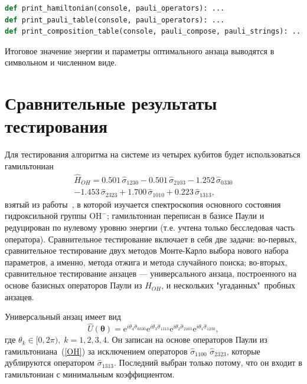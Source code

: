 \documentclass[a4paper]{report}
\begin{document}
\begin{lstlisting}[language=Python]
def print_hamiltonian(console, pauli_operators): ...
def print_pauli_table(console, pauli_operators): ...
def print_composition_table(console, pauli_compose, pauli_strings): ...
\end{lstlisting}

Итоговое значение энергии и параметры оптимального анзаца выводятся в символьном и численном виде.


\section{Сравнительные результаты тестирования}

Для тестирования алгоритма на системе из четырех кубитов будет использоваться гамильтониан
\begin{multline}\label{OH}
\hat{H}_{\scriptscriptstyle OH} = 0.501\,\hat{\sigma}_{1230} - 0.501\,\hat{\sigma}_{2103} - 1.252\,\hat{\sigma}_{0330} \\
- 1.453\,\hat{\sigma}_{2323} + 1.700\,\hat{\sigma}_{1010} + 0.223\,\hat{\sigma}_{1313},\quad
\end{multline}
взятый из работы~\cite{Cawley2013}, в которой изучается спектроскопия основного состояния гидроксильной группы $\mathrm{OH}^-$; гамильтониан переписан в базисе Паули и редуцирован по нулевому уровню энергии (т.е. учтена только бесследовая часть оператора). Сравнительное тестирование включает в себя две задачи: во-первых, сравнительное тестирование двух методов Монте-Карло выбора нового набора параметров, а именно, метода отжига и метода случайного поиска; во-вторых, сравнительное тестирование анзацев --- универсального анзаца, построенного на основе базисных операторов Паули из $\hat{H}_{\scriptscriptstyle OH}$, и нескольких "угаданных"\, пробных анзацев.


Универсальный анзац имеет вид
\begin{equation}\label{ansatz-OH}
\hat{U}(\bm\theta)= \mathrm{e}^{i\theta_4\hat{\sigma}_{0330}} \mathrm{e}^{i\theta_3\hat{\sigma}_{1313}} \mathrm{e}^{i\theta_2\hat{\sigma}_{2103}} \mathrm{e}^{i\theta_1\hat{\sigma}_{1230}},
\end{equation}
где $\theta_k\in[0,2\pi),\; k=1,2,3,4$. Он записан на основе операторов Паули из гамильтониана~(\ref{OH}) за исключением операторов $\hat{\sigma}_{1100}$   $\hat{\sigma}_{2323}$, которые дублируются оператором $\hat{\sigma}_{1313}$. Последний выбран только потому, что он входит в гамильтониан с минимальным коэффициентом.
\end{document}
